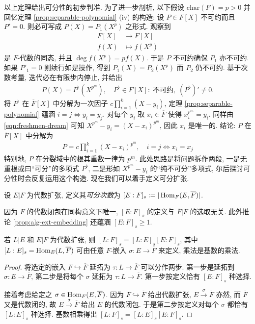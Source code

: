 以上定理给出可分性的初步判准. 为了进一步剖析, 以下假设 $\text{char}(F)=p > 0$ 并回忆定理 \ref{prop:separable-polynomial} (iv) 的构造: 设 $P \in F[X]$ 不可约而且 $P'=0$. 则必可写成 $P(X) = P_1(X^p)$ 之形式. 观察到
\begin{align*}
	F[X] & \longrightarrow F[X] \\
	f(X) & \longmapsto f(X^p)
\end{align*}
是 $F$-代数的同态, 并且 $\deg f(X^p) = p f(X)$. 于是 $P$ 不可约确保 $P_1$ 亦不可约. 如果 $P'_1 = 0$ 则续行如是操作, 得到 $P_1(X) = P_2(X^p)$ 而 $P_2$ 仍不可约. 基于次数考量, 迭代必在有限步内停止, 并给出 %
\begin{gather}\label{eqn:P-to-P-flat}
	P(X) = P^\flat\left( X^{p^m} \right), \quad P^\flat \in F[X]:\; \text{不可约}, \; (P^\flat)' \neq 0.
\end{gather}
将 $P^\flat$ 在 $\overline{F}[X]$ 中分解为一次因子 $c \prod_{i=1}^k (X - y_i)$, 定理 \ref{prop:separable-polynomial} 蕴涵 $i = j \iff y_i=y_j$. 对每个 $y_i$ 取 $x_i \in \overline{F}$ 使得 $x_i^{p^m} = y_i$. 同样由 \eqref{eqn:freshmen-dream} 可知 $X^{p^m} - y_i = (X - x_i)^{p^m}$, 因此 $x_i$ 是唯一的. 结论: $P$ 在 $\overline{F}[X]$ 中分解为
\begin{gather*}
	P = c \prod_{i=1}^k (X - x_i)^{p^m}, \quad i=j \iff x_i = x_j
\end{gather*}
特别地, $P$ 在分裂域中的根其重数一律为 $p^m$. 此处思路是将问题拆作两段, 一是无重根或曰``可分''的多项式 $P^\flat$, 二是形如 $X^{p^m} - y_i$ 的``纯不可分''多项式, 尔后探讨可分性时会反复运用这个构造. 现在我们可以着手定义可分扩张.

\begin{definition}
	设 $E|F$ 为代数扩张, 定义其\emph{可分次数}为 $[E:F]_s := |\operatorname{Hom}_F(E, \overline{F})|$.
\end{definition}
因为 $F$ 的代数闭包在同构意义下唯一, $[E:F]_s$ 的定义与 $\overline{F}|F$ 的选取无关. 此外推论 \ref{prop:alg-ext-embedding} 还蕴涵 $[E:F]_s \geq 1$.

\begin{proposition}\label{prop:field-tower-sdegree}
	若 $L|E$ 和 $E|F$ 为代数扩张, 则 $[L:F]_s = [L:E]_s [E:F]_s$, 其中 $[L:E]_s = \operatorname{Hom}_E(L, \overline{F})$ 可由任意 $F$-嵌入 $\sigma: E \to \overline{F}$ 来定义, 乘法是基数的乘法.
\end{proposition}
\begin{proof}
	将选定的嵌入 $F \hookrightarrow \overline{F}$ 延拓为 $\tau: L \to \overline{F}$ 可以分作两步. 第一步是延拓到 $\sigma: E \to \overline{F}$, 第二步是将每个 $\sigma$ 延拓为 $\tau: L \to \overline{F}$. 第一步按定义恰有 $[E:F]_s$ 种选择.

	接着考虑给定之 $\sigma \in \operatorname{Hom}_F(E, \overline{F})$. 因为 $F \hookrightarrow \overline{F}$ 给出代数扩张, $E \xrightarrow{\sigma} \overline{F}$ 亦然, 而 $\overline{F}$ 又是代数闭的, 故 $E \xrightarrow{\sigma} \overline{F}$ 给出 $E$ 的代数闭包. 于是第二步按定义对每个 $\sigma$ 都恰有 $[L:E]_s$ 种选择. 基数相乘得出 $[L:F]_s = [L:E]_s [E:F]_s$.
\end{proof}

